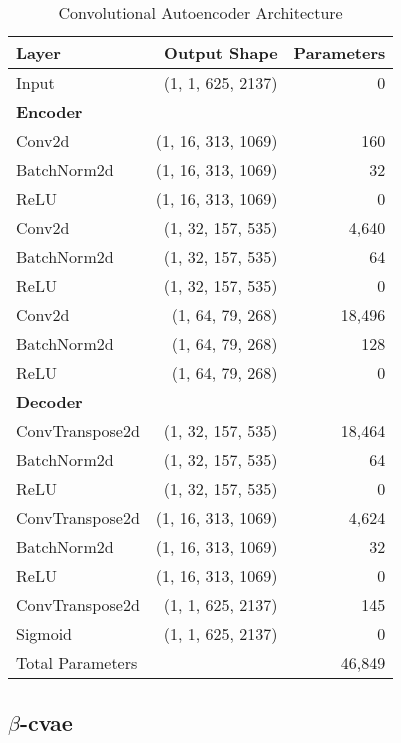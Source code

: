 \begin{table}[!h]
    \centering
    \begin{tabular}{lrr}
        \toprule
        Layer & Output Shape & Parameters \\
        \midrule
        Input & (1, 1, 625, 2137) & 0 \\
        \multicolumn{3}{l}{\textbf{Encoder}} \\
        Conv2d & (1, 16, 313, 1069) & 160 \\
        BatchNorm2d & (1, 16, 313, 1069) & 32 \\
        ReLU & (1, 16, 313, 1069) & 0 \\
        Conv2d & (1, 32, 157, 535) & 4,640 \\
        BatchNorm2d & (1, 32, 157, 535) & 64 \\
        ReLU & (1, 32, 157, 535) & 0 \\
        Conv2d & (1, 64, 79, 268) & 18,496 \\
        BatchNorm2d & (1, 64, 79, 268) & 128 \\
        ReLU & (1, 64, 79, 268) & 0 \\
        \multicolumn{3}{l}{\textbf{Decoder}} \\
        ConvTranspose2d & (1, 32, 157, 535) & 18,464 \\
        BatchNorm2d & (1, 32, 157, 535) & 64 \\
        ReLU & (1, 32, 157, 535) & 0 \\
        ConvTranspose2d & (1, 16, 313, 1069) & 4,624 \\
        BatchNorm2d & (1, 16, 313, 1069) & 32 \\
        ReLU & (1, 16, 313, 1069) & 0 \\
        ConvTranspose2d & (1, 1, 625, 2137) & 145 \\
        Sigmoid & (1, 1, 625, 2137) & 0 \\
        \midrule
        Total Parameters & & 46,849 \\
        \bottomrule
    \end{tabular}
    \caption{Convolutional Autoencoder Architecture}
    \label{tab:cae}
\end{table}


\subsection{$\beta$-\acrshort{cvae}}
\label{app:a-cvae}

